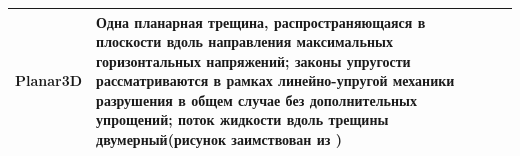 \begin{longtable}[l]{|L{2.2cm}|m{7.3cm}|L{6.2cm}|}
	Planar3D&Одна планарная трещина, распространяющаяся в плоскости вдоль направления максимальных горизонтальных напряжений; законы упругости рассматриваются в рамках линейно-упругой механики разрушения в общем случае без дополнительных упрощений; поток жидкости вдоль трещины двумерный\break\hfill\break (рисунок заимствован из \cite{valov_baykin_dontsov})&\hfill\break{}\hfill\break\\ \hline

\end{longtable}
